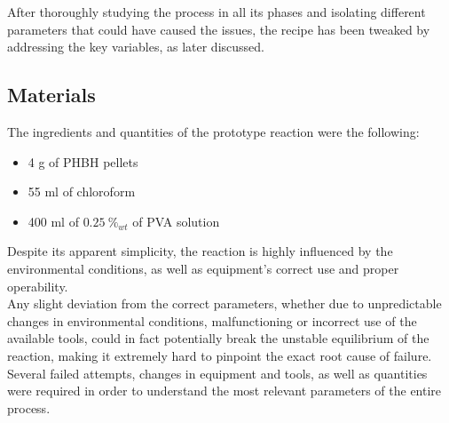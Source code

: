 \documentclass[a4paper]{article}
\begin{document}
%
%

    After thoroughly studying the process in all its phases and isolating different parameters that could have caused the issues, 
    the recipe has been tweaked by addressing the key variables, as later discussed. 

        \subsection{Materials\label{Components}}

        The ingredients and quantities of the prototype reaction were the following: 

            \begin{itemize}
                \item 4 g of PHBH pellets 
                \item 55 ml of chloroform 
                \item 400 ml of $0.25 \ \%_{wt} $ of PVA solution 
            \end{itemize} 
        

        Despite its apparent simplicity, the reaction is highly influenced by the environmental conditions, as well as
        equipment's correct use and proper operability. \\ 
        
        Any slight deviation from the correct parameters, whether due to 
        unpredictable changes in environmental conditions, malfunctioning or incorrect use of the available tools, could 
        in fact potentially break the unstable equilibrium of the reaction, making it extremely 
        hard to pinpoint the exact root cause of failure. \\  

        Several failed attempts, changes in equipment and tools, as well as quantities were required in order 
        to understand the most relevant parameters of the entire process. 
\end{document}
